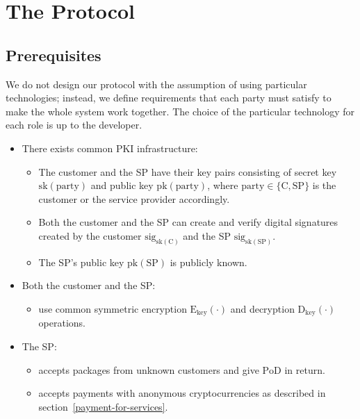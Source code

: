 \documentclass{ieeeaccess}
\begin{document}
\section{The Protocol}\label{sec:protocol}

\subsection{Prerequisites}
We do not design our protocol with the assumption of using particular technologies; instead, we define requirements that each party must satisfy to make the whole system work together. The choice of the particular technology for each role is up to the developer.

\begin{itemize}
\item There exists common PKI infrastructure:
    \begin{itemize}
        \item The customer and the SP have their key pairs consisting of secret key $\mathrm{sk}(\mathrm{party})$ and public key $\mathrm{pk}(\mathrm{party})$, where $\mathrm{party} \in \{\mathrm{C}, \mathrm{SP}\}$ is the customer or the service provider accordingly.
        \item Both the customer and the SP can create and verify digital signatures created by the customer $\mathrm{sig}_{\mathrm{sk}(\mathrm{C})}$ and the SP $\mathrm{sig}_{\mathrm{sk}(\mathrm{SP})}$.
        \item The SP's public key $\mathrm{pk}(\mathrm{SP})$ is publicly known.
    \end{itemize}
    
\item Both the customer and the SP:
    \begin{itemize}
        \item use common symmetric encryption $\mathrm{E}_\mathrm{key}(\cdot)$ and decryption $\mathrm{D}_\mathrm{key}(\cdot)$ operations.
    \end{itemize}

\item The SP:
    \begin{itemize}
        \item accepts packages from unknown customers and give $\mathrm{PoD}$ in return.
        \item accepts payments with anonymous cryptocurrencies as described in section~\ref{payment-for-services}.
    \end{itemize}
    

\end{itemize}
\end{document}
